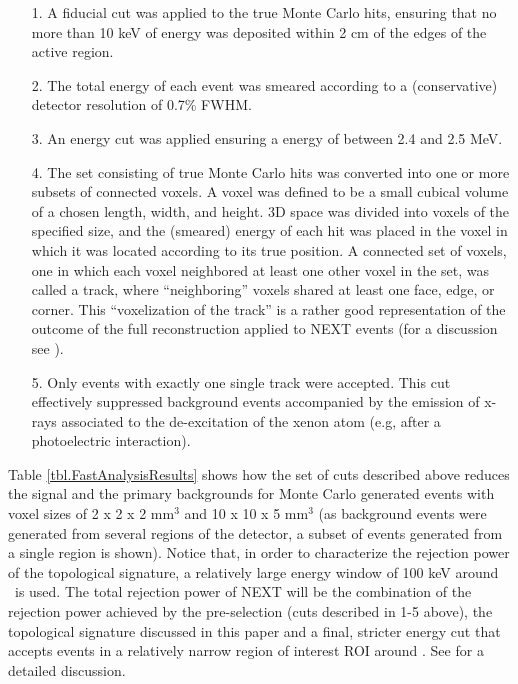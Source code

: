 \documentclass[a4paper,11pt]{article}
\begin{document}
\begin{enumerate}
	\item[1.] A fiducial cut was applied to the true Monte Carlo hits, ensuring that no more than 10 keV of energy was deposited within 2 cm of the edges of the active region.
	\item[2.] The total energy of each event was smeared according to a (conservative) detector resolution of 0.7\% FWHM.
	\item[3.] An energy cut was applied ensuring a energy of between 2.4 and 2.5 MeV.
	\item[4.] The set consisting of true Monte Carlo hits was converted into one or more subsets of connected voxels.  A voxel was defined to be a small cubical volume of a chosen 
	length, width, and height.  3D space was divided into voxels of the specified size, and the (smeared) energy of each hit was placed in the voxel in which it was located according to its
	true position.  A connected set of voxels, one in which each voxel neighbored at least one other voxel in the set, was called a track, where ``neighboring'' voxels shared at least one face, edge,
	or corner. This ``voxelization of the track'' is a rather good representation of the outcome of the full reconstruction applied to NEXT events (for a discussion see \cite{NEXT_topology}). 
	\item[5.] Only events with exactly one single track were accepted.  This cut effectively suppressed background events accompanied by the emission of x-rays associated to the de-excitation of the xenon atom (e.g, after a photoelectric interaction). 
\end{enumerate}

Table \ref{tbl.FastAnalysisResults} shows how the set of cuts described above reduces the signal and the primary backgrounds for Monte Carlo generated events with voxel sizes of 2 x 2 x 2 mm$^3$ and 10 x 10 x 5 mm$^3$ (as background events were generated from several regions of the detector, a subset of events generated from a single region is shown).  Notice that, in order to characterize the rejection power of the topological signature, a relatively large energy window of 100 keV around \Qbb\ is used. The total rejection power of NEXT will be the combination of the rejection power achieved by the pre-selection (cuts described in 1-5 above), the topological signature discussed in this paper and a final, stricter energy cut that accepts events in a relatively narrow region of interest ROI around \Qbb. See \cite{Martin-Albo:2015rhw} for a detailed discussion.
\end{document}
